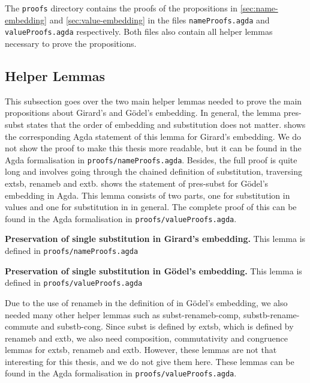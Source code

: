 The \texttt{proofs} directory contains the proofs of the propositions in \cref{sec:name-embedding} and \cref{sec:value-embedding} in the files \texttt{nameProofs.agda} and \texttt{valueProofs.agda} respectively.
Both files also contain all helper lemmas necessary to prove the propositions.

\subsection{Helper Lemmas}
\label{sec:helper-lemmas}
This subsection goes over the two main helper lemmas needed to prove the main propositions about Girard's and Gödel's embedding.
In general, the lemma \textsf{pres-subst} states that the order of embedding and substitution does not matter.
 shows the corresponding Agda statement of this lemma for Girard's embedding.
We do not show the proof to make this thesis more readable, but it can be found in the Agda formalisation in \texttt{proofs/nameProofs.agda}.
Besides, the full proof is quite long and involves going through the chained definition of substitution, traversing \textsf{extsb}, \textsf{renameb} and \textsf{extb}.
 shows the statement of \textsf{pres-subst} for Gödel's embedding in Agda. This lemma consists of two parts, one for substitution in values and one for substitution in \lterms in general.
The complete proof of this can be found in the Agda formalisation in \texttt{proofs/valueProofs.agda}.

\begin{lemma}
  \label{lem:pres-subst}
  \textbf{Preservation of single substitution in Girard's embedding.}
 This lemma is defined in \texttt{proofs/nameProofs.agda}
  \small
  
\end{lemma}

\begin{lemma}
  \label{lem:pres-subst-godel}
  \textbf{Preservation of single substitution in Gödel's embedding.}
 This lemma is defined in \texttt{proofs/valueProofs.agda}
  \small
  
\end{lemma}

%   

Due to the use of \textsf{renameb} in the definition of \raiseembn in Gödel's embedding, we also needed many other helper lemmas such as \textsf{subst-renameb-comp}, \textsf{substb-rename-commute} and \textsf{substb-cong}.
Since \textsf{subst} is defined by \textsf{extsb}, which is defined by \textsf{renameb} and \textsf{extb}, we also need composition, commutativity and congruence lemmas for \textsf{extsb}, \textsf{renameb} and \textsf{extb}.
However, these lemmas are not that interesting for this thesis, and we do not give them here. These lemmas can be found in the Agda formalisation in \texttt{proofs/valueProofs.agda}.


